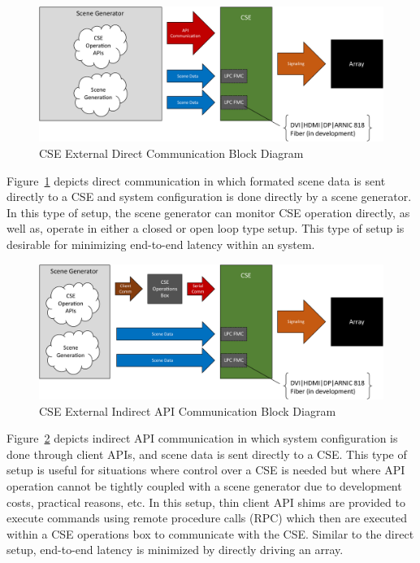     \begin{figure}
        \centering
        \includegraphics[width=1.0\textwidth]{fig/external_cse_comm_direct.pdf}
        \caption{CSE External Direct Communication Block Diagram}
        \label{fig:external_cse_comm_direct}
    \end{figure}

    Figure~\ref{fig:external_cse_comm_direct} depicts direct communication in which formated scene data is sent directly to a CSE and system configuration is done directly by a scene generator. In this type of setup, the scene generator can monitor CSE operation directly, as well as, operate in either a closed or open loop type setup. This type of setup is desirable for minimizing end-to-end latency within an system.

    \begin{figure}
        \centering
        \includegraphics[width=1.0\textwidth]{fig/external_cse_comm_half_indirect.pdf}
        \caption{CSE External Indirect API Communication Block Diagram}
        \label{fig:external_cse_comm_half_indirect}
    \end{figure}

    Figure~\ref{fig:external_cse_comm_half_indirect} depicts indirect API communication in which system configuration is done through client APIs, and scene data is sent directly to a CSE. This type of setup is useful for situations where control over a CSE is needed but where API operation cannot be tightly coupled with a scene generator due to development costs, practical reasons, etc. In this setup, thin client API shims are provided to execute commands using remote procedure calls (RPC) which then are executed within a CSE operations box to communicate with the CSE. Similar to the direct setup, end-to-end latency is minimized by directly driving an array.


